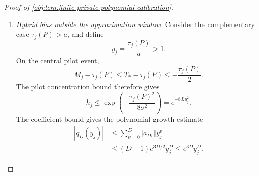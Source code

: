 \documentclass[11pt]{article}
\begin{document}
\begin{proof}[Proof of \cref{obj:lem:finite-private-polynomial-calibration}]
\begin{enumerate}
The elementary exponential envelopes give
\[
\tau_j(P)e^{-\tau_j(P)^2/(2\sigma^2)}\le\sigma,
\qquad
\tau_j(P)^2e^{-\tau_j(P)^2/(2\sigma^2)}\le\sigma^2.
\]
For the first inequality, multiply
\[
\frac{\tau_j(P)}{\sigma}
\le1+\frac{\tau_j(P)^2}{2\sigma^2}
\le e^{\tau_j(P)^2/(2\sigma^2)}
\]
by \(\sigma e^{-\tau_j(P)^2/(2\sigma^2)}\). For the second, use the elementary maximum
\[
u e^{-u}\le e^{-1}\qquad(u\ge0)
\]
at \(u=\tau_j(P)^2/(2\sigma^2)\), together with \(2/e\le1\). Consequently,
\[
\tau_j(P)w_j\le\sigma e^{-8L},
\qquad
\tau_j(P)^2w_j\le\sigma^2e^{-8L}\le\sigma^2.
\]
Moreover,
\[
\sqrt L\le L\le e^{8L},
\qquad
e^{-8L}\le\frac1{\sqrt L},
\qquad
\tau_j(P)w_j\le\frac{\sigma}{\sqrt L}.
\]

Suppose in addition that \(\tau_j(P)\le a\). Approximation and the degree lower bound imply
\[
\begin{aligned}
|p_{a,D}(\tau_j(P))-\tau_j(P)|
&\le\frac{2a}{\pi(D+1)}
\le\frac a{D+1}\\
&\le16384\,\frac{\sigma}{\sqrt L}.
\end{aligned}
\]
To compute the hybrid mean, its three disjoint pilot branches give
\[
H_j
=\widehat p_{a,D,j}\mathbf1_{\{|M_j|\le T_*\}}
+\overline W_j\mathbf1_{\{M_j>T_*\}}
-\overline W_j\mathbf1_{\{M_j<-T_*\}}.
\]
Block independence, polynomial unbiasedness, and the probability partition yield
\[
\begin{aligned}
\mathbb EH_j
&=h_jp_{a,D}(\tau_j(P))
 +(1-h_j-2w_j)\tau_j(P),\\
\mathbb EH_j-\tau_j(P)
&=h_j\bigl(p_{a,D}(\tau_j(P))-\tau_j(P)\bigr)
 -2\tau_j(P)w_j.
\end{aligned}
\]
Hence, throughout \(0\le\tau_j(P)\le a\),
\[
\begin{aligned}
|\mathbb EH_j-\tau_j(P)|
&\le h_j|p_{a,D}(\tau_j(P))-\tau_j(P)|
       +2\tau_j(P)w_j\\
&\le(16384+2)\frac{\sigma}{\sqrt L}
\le20000\,\frac{\sigma}{\sqrt L}.
\end{aligned}
\]

\item \textit{Hybrid bias outside the approximation window.}
Consider the complementary case \(\tau_j(P)>a\), and define
\[
y_j=\frac{\tau_j(P)}a>1.
\]
On the central pilot event,
\[
M_j-\tau_j(P)
\le T_*-\tau_j(P)
\le-\frac{\tau_j(P)}2.
\]
The pilot concentration bound therefore gives
\[
h_j
\le\exp\!\left(-\frac{\tau_j(P)^2}{8\sigma^2}\right)
=e^{-8Ly_j^2}.
\]
The coefficient bound gives the polynomial growth estimate
\[
\begin{aligned}
|q_D(y_j)|
&\le\sum_{v=0}^D|a_{Dv}|y_j^v\\
&\le(D+1)e^{3D/2}y_j^D
\le e^{3D}y_j^D.
\end{aligned}
\]


\end{enumerate}
\end{proof}
\end{document}
